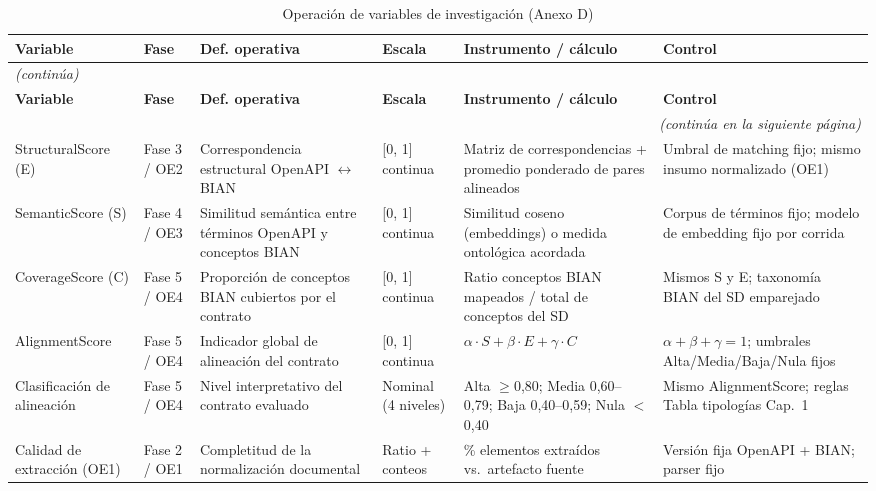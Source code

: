 \begin{longtable}{@{}p{}p{}p{}p{}p{}p{}@{}}
\caption{Operación de variables de investigación (Anexo D)} \label{tab:anexo-d} \\
\toprule
\textbf{Variable} & \textbf{Fase} & \textbf{Def. operativa} & \textbf{Escala} & \textbf{Instrumento / cálculo} & \textbf{Control} \\
\midrule
\endfirsthead
\multicolumn{6}{l}{\textit{(continúa)}} \\
\midrule
\textbf{Variable} & \textbf{Fase} & \textbf{Def. operativa} & \textbf{Escala} & \textbf{Instrumento / cálculo} & \textbf{Control} \\
\midrule
\endhead
\midrule
\multicolumn{6}{r}{\textit{(continúa en la siguiente página)}} \\
\endfoot
\bottomrule
\endlastfoot
StructuralScore (E) & Fase 3 / OE2 & Correspondencia estructural OpenAPI $\leftrightarrow$ BIAN & [0, 1] continua & Matriz de correspondencias + promedio ponderado de pares alineados & Umbral de matching fijo; mismo insumo normalizado (OE1) \\
SemanticScore (S) & Fase 4 / OE3 & Similitud semántica entre términos OpenAPI y conceptos BIAN & [0, 1] continua & Similitud coseno (embeddings) o medida ontológica acordada & Corpus de términos fijo; modelo de embedding fijo por corrida \\
CoverageScore (C) & Fase 5 / OE4 & Proporción de conceptos BIAN cubiertos por el contrato & [0, 1] continua & Ratio conceptos BIAN mapeados / total de conceptos del SD & Mismos S y E; taxonomía BIAN del SD emparejado \\
AlignmentScore & Fase 5 / OE4 & Indicador global de alineación del contrato & [0, 1] continua & $\alpha \cdot S + \beta \cdot E + \gamma \cdot C$ & $\alpha+\beta+\gamma=1$; umbrales Alta/Media/Baja/Nula fijos \\
Clasificación de alineación & Fase 5 / OE4 & Nivel interpretativo del contrato evaluado & Nominal (4 niveles) & Alta $\geq$0,80; Media 0,60--0,79; Baja 0,40--0,59; Nula $<$0,40 & Mismo AlignmentScore; reglas Tabla tipologías Cap.~1 \\
Calidad de extracción (OE1) & Fase 2 / OE1 & Completitud de la normalización documental & Ratio + conteos & \% elementos extraídos vs.\ artefacto fuente & Versión fija OpenAPI + BIAN; parser fijo \\
\end{longtable}
